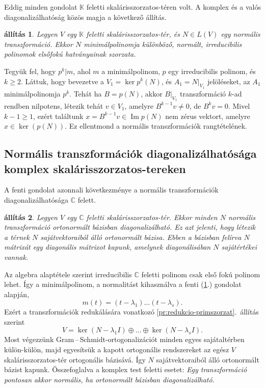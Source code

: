 \documentclass[9pt, a4paper, showtrims]{memoir}
\makeatletter
\renewenvironment{proof}[1][\proofname]
    {\par\pushQED{\qed}%
    \normalfont \topsep6\p@\@plus6\p@\relax
    \trivlist
    \item[\hskip\labelsep
        \itshape
    #1\@addpunct{:}]\ignorespaces}
    {\popQED\endtrivlist\@endpefalse}
\theoremstyle{plain}
\newtheorem{proposition}{állítás}[chapter]
\theoremstyle{remark}
\theoremstyle{definition}
\DeclareMathOperator{\im}{Im}
\makeatother
\begin{document}
Eddig minden gondolat $\mathbb{K}$ feletti skalárisszorzatos-téren volt.
A komplex és a valós diagonalizálhatóság közös magja a következő állítás.
\begin{proposition}\label{pr:normalis-mult1}
	Legyen $V$ egy $\mathbb{K}$ feletti skalárisszorzatos-tér,
	és $N\in L\left( V \right)$ egy normális transzformáció.
	Ekkor $N$ minimálpolinomja különböző, normált, irreducibilis polinomok elsőfokú hatványainak szorzata.
\end{proposition}
\begin{proof}
	Tegyük fel, hogy $p^k|m$, ahol $m$ a minimálpolinom,
	$p$ egy irreducibilis polinom, és $k\geq 2.$
	Láttuk, hogy bevezetve a $V_1=\ker p^k\left( N \right)$, és
	$A_1=N|_{V_1}$ jelöléseket,
	az $A_1$ minimálpolinomja $p^k$.
	Tehát ha $B=p(N)$, akkor $B|_{V_1}$ transzformáció $k$-ad rendben nilpotens,
	létezik tehát $v\in V_1$,
	amelyre $B^{k-1}v\neq 0$,
	de $B^kv=0$.
	Mivel $k-1\geq 1$, ezért találtunk $x=B^{k-1}v\in\im p\left( N \right)$
	nem zérus vektort,
	amelyre $x\in\ker(p\left( N \right))$.
	Ez ellentmond a normális transzformációk rangtételének.
\end{proof}
\subsection{Normális transzformációk diagonalizálhatósága komplex skalárisszorzatos-tereken}
A fenti gondolat azonnali következménye a normális transzformációk diagonalizálhatósága $\mathbb{C}$ felett.
\begin{proposition}
	Legyen $V$ egy $\mathbb{C}$ feletti skalárisszorzatos-tér.
	Ekkor minden $N$ normális transzformáció ortonormált bázisban diagonalizálható.
	Ez azt jelenti, hogy létezik a térnek $N$ sajátvektoraiból álló ortonormált bázisa.
	Ebben a bázisban felírva $N$ mátrixát egy diagonális mátrixot kapunk,
	amelynek diagonálisában $N$ sajátértékei vannak.
\end{proposition}
\begin{proof}
	Az algebra alaptétele szerint irreducibilis $\mathbb{C}$ feletti polinom
	csak első fokú polinom lehet.
	Így a minimálpolinom, a normalitást kihasználva a fenti (\ref{pr:normalis-mult1}.) gondolat alapján,
	\[
		m\left( t \right)=\left( t-\lambda_1 \right)\dots\left( t-\lambda_s \right).
	\]
	Ezért a transzformációk redukálására vonatkozó \ref{pr:redukcio-primszorzat}.~állítás szerint
	\[
		V=\ker\left( N-\lambda_1I \right)\oplus\dots\oplus\ker\left( N-\lambda_sI \right).
	\]
	Most végezzünk Gram\,--\,Schmidt-ortogonalizációt
	minden egyes sajátaltérben külön-külön,
	majd egyesítsük a kapott ortogonális rendszereket az egész $V$ skalárisszorzatos-tér ortogonális bázisává.
	Így $N$ sajátvektoraiból álló ortonormált bázist kapunk.
\end{proof}
Összefoglalva a komplex test feletti esetet:
\emph{
	Egy transzformáció pontosan akkor normális,
	ha ortonormált bázisban diagonalizálható.
}
\end{document}
